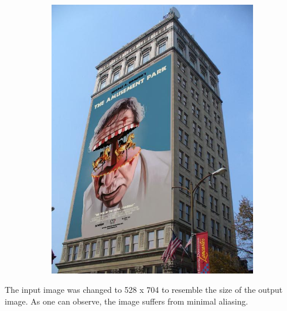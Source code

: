 \documentclass{article}
\begin{document}
\begin{figure}[H]
\begin{subfigure}{.3\textwidth}
        \includegraphics[scale=0.5]{q2/output/output_same.jpg}
        \label{fig 1}
    \end{subfigure}
\end{figure}
The input image was changed to 528 x 704 to resemble the size of the output image. As one can observe, the image suffers from minimal aliasing. 
\end{document}
